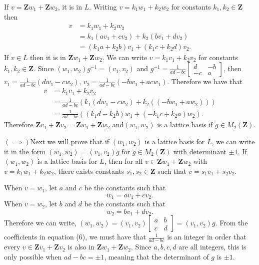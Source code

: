 \documentclass{article}
\begin{document}
If $v = \mathbf{Z}w_1 + \mathbf{Z}w_2$, it is in $L$.
Writing $v = k_1w_1 + k_2w_2$ for constants $k_1, k_2 \in \mathbf{Z}$
then
\begin{align}
	v &= k_1w_1 + k_2w_2 \\
	  &= k_1(av_1 + cv_2) + k_2(bv_1 + dv_2) \\
	  &= (k_1a + k_2b)v_1 + (k_1c + k_2d)v_2.
\end{align}
If $v \in L$ then it is in $\mathbf{Z}w_1 + \mathbf{Z}w_2$.
We can write $v = k_1v_1 + k_2v_2$
for constants $k_1, k_2 \in \mathbf{Z}$.
Since $(w_1,w_2)g^{-1} = (v_1,v_2)$ and $g^{-1} = \frac{1}{ad-bc}\begin{bmatrix}
	d & -b \\
	-c & a
\end{bmatrix}$, then 
$v_1 = \frac{1}{ad-bc} (dw_1 - cw_2)$,
$v_2 = \frac{1}{ad-bc}(-bw_1 + acw_1)$.
Therefore we have that
\begin{align}
	v &= k_1v_1 + k_2v_2 \\
	  &= \frac{1}{ad-bc}\left( k_1(dw_1 - cw_2) + k_2((-bw_1 + aw_2))\right) \\
	  &= \frac{1}{ad-bc}\left(  (k_1d - k_2b)w_1 + (-k_1c + k_2a)w_2\right). 
\end{align}
Therefore $\mathbf{Z}v_1 + \mathbf{Z}v_2 = \mathbf{Z}w_1 + \mathbf{Z}w_2$ 
and$(w_1, w_2)$ is a lattice basis if $g \in M_2(\mathbf{Z})$.

$(\implies)$Next we will prove that if $(w_1,w_2)$ is a lattice basis for $L$,
we can write it in the form $(w_1,w_2) = (v_1,v_2)g$
for $g \in M_2(\mathbf{Z})$ with determinant $\pm 1$.
If $(w_1,w_2)$ is a lattice basis for $L$, then 
for all $v \in \mathbf{Z}w_1 + \mathbf{Z}w_2$ with $v = k_1w_1 + k_2w_2$, there exists
constants $s_1, s_2 \in \mathbf{Z}$ such that
$v = s_1v_1 + s_2v_2$.

When $v = w_1$, let $a$ and $c$ be the constants such that 
\[
	w_1 = av_1 + cv_2.
\]
When $v = w_2$, let $b$ and $d$ be the constants such that 
\[
	w_2 = bv_1 + dv_2.
\]
Therefore we can write,
$(w_1,w_2) = (v_1,v_2)\begin{bmatrix}
	a & b \\
	c & d
\end{bmatrix} = (v_1,v_2)g$.
From the coefficients in equation (6),
we must have that $\frac{1}{ad-bc}$ is an integer
in order that every $v\in \mathbf{Z}v_1 + \mathbf{Z}v_2$ is also in $\mathbf{Z}w_1 + \mathbf{Z}w_2$.
Since $a,b,c,d$ are all integers, this is only 
possible when $ad-bc = \pm 1$, meaning that the 
determinant of $g$ is $\pm 1$.
\newpage 
\end{document}
